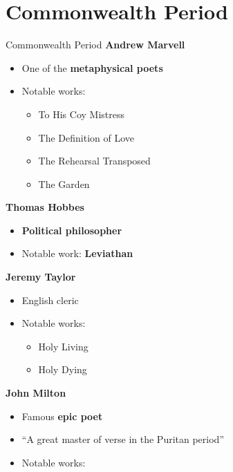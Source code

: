 \documentclass[
  12pt,
    progressbar=frametitle]{beamer}
\providecommand{\tightlist}{%
  \setlength{\itemsep}{0pt}\setlength{\parskip}{0pt}}
\begin{document}
\section{Commonwealth Period}
\begin{frame}[allowframebreaks]
{Commonwealth Period}
\large\textbf{Andrew Marvell}\normalsize\vspace{-3mm}

\begin{itemize}
\tightlist
\item
  One of the \textbf{metaphysical poets}
\item
  Notable works:

  \begin{itemize}
  \tightlist
  \item
    To His Coy Mistress
  \item
    The Definition of Love
  \item
    The Rehearsal Transposed
  \item
    The Garden
  \end{itemize}
\end{itemize}

\large\textbf{Thomas Hobbes}\normalsize\vspace{-3mm}

\begin{itemize}
\tightlist
\item
  \textbf{Political philosopher}
\item
  Notable work: \textbf{Leviathan}
\end{itemize}

\large\textbf{Jeremy Taylor}\normalsize\vspace{-3mm}

\begin{itemize}
\tightlist
\item
  English cleric
\item
  Notable works:

  \begin{itemize}
  \tightlist
  \item
    Holy Living
  \item
    Holy Dying
  \end{itemize}
\end{itemize}

\large\textbf{John Milton}\normalsize\vspace{-3mm}

\begin{itemize}
\tightlist
\item
  Famous \textbf{epic poet}
\item
  ``A great master of verse in the Puritan period''
\item
  Notable works:
\end{itemize}


\end{frame}
\end{document}
